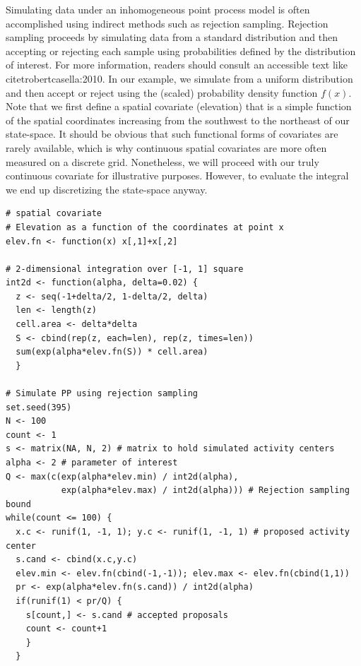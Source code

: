 \documentclass{book}
\begin{document}
Simulating data under an inhomogeneous point process model is often
accomplished using indirect methods such as rejection
sampling. Rejection sampling proceeds by
simulating data from a standard distribution and then accepting or
rejecting each sample using probabilities defined by the distribution
of interest. For more information, readers should consult an
accessible text like citet{robertcasella:2010}. In our example, we
simulate from a uniform distribution and then accept or reject using
the (scaled) probability density function $f(x)$. Note that we first define a
spatial covariate (elevation) that is a simple function of the spatial
coordinates increasing from the southwest to the northeast of our
state-space. It should be obvious that such functional forms of
covariates are rarely available, which is why continuous spatial
covariates are more often measured on a discrete grid. Nonetheless, we
will proceed with our truly continuous covariate for illustrative
purposes. However, to evaluate the integral we end up discretizing the
state-space anyway.


\begin{small}
\begin{verbatim}
# spatial covariate
# Elevation as a function of the coordinates at point x
elev.fn <- function(x) x[,1]+x[,2]

# 2-dimensional integration over [-1, 1] square
int2d <- function(alpha, delta=0.02) {
  z <- seq(-1+delta/2, 1-delta/2, delta)
  len <- length(z)
  cell.area <- delta*delta
  S <- cbind(rep(z, each=len), rep(z, times=len))
  sum(exp(alpha*elev.fn(S)) * cell.area)
  }

# Simulate PP using rejection sampling
set.seed(395)
N <- 100
count <- 1
s <- matrix(NA, N, 2) # matrix to hold simulated activity centers
alpha <- 2 # parameter of interest
Q <- max(c(exp(alpha*elev.min) / int2d(alpha),
           exp(alpha*elev.max) / int2d(alpha))) # Rejection sampling bound
while(count <= 100) {
  x.c <- runif(1, -1, 1); y.c <- runif(1, -1, 1) # proposed activity center
  s.cand <- cbind(x.c,y.c)
  elev.min <- elev.fn(cbind(-1,-1)); elev.max <- elev.fn(cbind(1,1))
  pr <- exp(alpha*elev.fn(s.cand)) / int2d(alpha)
  if(runif(1) < pr/Q) {
    s[count,] <- s.cand # accepted proposals
    count <- count+1
    }
  }
\end{verbatim}
\end{small}
\end{document}
